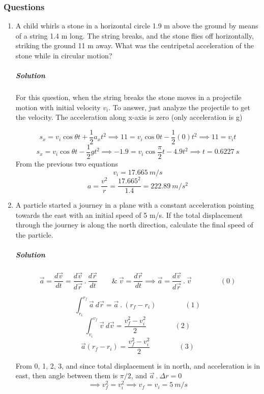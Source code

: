\documentclass{article}
\begin{document}
\subsubsection{Questions}
\begin{enumerate}[1.]
	\item A  child  whirls  a  stone  in  a  horizontal  circle 1.9 m above  the  ground  by  means  of  a string 1.4 m long.  The  string  breaks,  and  the  stone  flies  off  horizontally,  striking  the ground 11 m away.  What  was  the  centripetal  acceleration  of  the  stone  while  in  circular motion? 
		\subparagraph{Solution} For this question, when the string breaks the stone moves in a projectile motion with initial velocity $ v_i $. To answer, just analyze the projectile to get the velocity. The acceleration along x-axis is zero (only acceleration is g)

		\[
			s_x = v_i \cos{ \theta }  t+  \frac{1}{2} a_x t^2 \implies 11 = v_i \cos{ 0 } t - \frac{1}{2} (0) t^2 \implies 11 = v_i t
		\]
		\[
			s_x = v_i \cos{ \theta } t - \frac{1}{2} g t^2 \implies -1.9 = v_i \cos{ \frac{\pi}{2} } t - 4.9 t^2 \implies t =  0.6227\ s
		\]
		From the previous two equations
		\[
			v_i = 17.665\ m / s
		\]
		\[
			a = \frac{v^2}{r} = \frac{17.665^2}{1.4} = 222.89\ m / s^2
		\]

	\item A particle started a journey in a plane with a constant acceleration pointing towards the east with an initial speed of 5 m/s. If the total displacement through the journey is along the north direction, calculate the final speed of the particle.
		\subparagraph{Solution}
		\[
			\vec{ a } = \frac{ d \vec{ v } }{ dt } = \frac{ d\vec{ v } }{ d \vec{ r } }\ .\ \frac{ d \vec{ r } }{ dt } \qquad \&\ \vec{ v }= \frac{ d \vec{ r } }{ d t }  \implies \vec{ a } = \frac{ d \vec{ v } }{ d \vec{ r } }\ .\ \vec{ v }   \qquad \qquad  (0)
		\]

		\[
			\int^{r_f}_{r_i} \vec{ a }\ d \vec{ r } = \vec{ a } \ . \   (r_f-r_i) \qquad \qquad (1)
		\]
		\[
			\int^{v_f}_{v_i} \vec{ v }\ d \vec{ v }  =  \frac{v_f^2 - v_i^2 }{2} \qquad \qquad (2)
		\]
		\[
			\vec{ a } (r_f - r_i) =  \frac{v_f^2 - v_i^2 }{2} \qquad  \qquad (3)
		\]


		From 0, 1, 2, 3, and since total displacement is in north, and acceleration is in east, then angle between them is $ \pi /2 $, and $ \vec{ a }\ .\ \varDelta r = 0 $
		\[
			\implies v_f^2 = v_i^2 \implies v_f = v_i = 5\ m / s
		\]


\end{enumerate}
\end{document}
